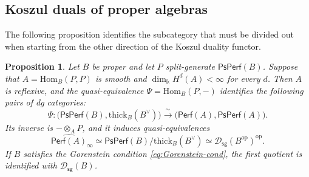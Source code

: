 \documentclass[11pt,letterpaper,reqno]{amsart}
\theoremstyle{plain}
\newtheorem{proposition}[proposition]{Proposition}
\theoremstyle{definition}
\theoremstyle{plain}
\theoremstyle{definition}
\numberwithin{equation}{section}
\begin{document}
\subsection{Koszul duals of proper algebras}

The following proposition identifies the subcategory that must be divided out when starting from the other direction of the Koszul duality functor.

\begin{proposition}\label{prop:algebraic-boundary}
Let $B$ be proper and let $P$ split-generate $\mathsf{PsPerf}(B)$.
Suppose that $A=\mathrm{Hom}_B(P,P)$ is smooth and $\dim_{\Bbbk}H^d(A)<\infty$ for every $d$.
Then $A$ is reflexive, and the quasi-equivalence $\Psi=\mathrm{Hom}_B(P,-)$ identifies the following pairs of dg categories:
\begin{equation}\label{eq:algebraic-pairs}
\Psi: \bigl(\mathsf{PsPerf}(B),\mathrm{thick}_B(B^\vee)\bigr)
\xrightarrow{\;\sim\;}
\bigl(\mathsf{Perf}(A),\mathsf{PsPerf}(A)\bigr).
\end{equation}
Its inverse is $-\otimes_A P$, and it induces quasi-equivalences
\begin{equation}\label{eq:proper-algebra-boundary}
\widehat{\mathsf{Perf}(A)}_\infty
\simeq\mathsf{PsPerf}(B)/\mathrm{thick}_B(B^\vee)
\simeq\mathscr D_{\mathsf{sg}}(B^{\mathrm{op}})^{\mathrm{op}}.
\end{equation}
If $B$ satisfies the Gorenstein condition \eqref{eq:Gorenstein-cond}, the first quotient is identified with $\mathscr D_{\mathsf{sg}}(B)$.
\end{proposition}
\end{document}
